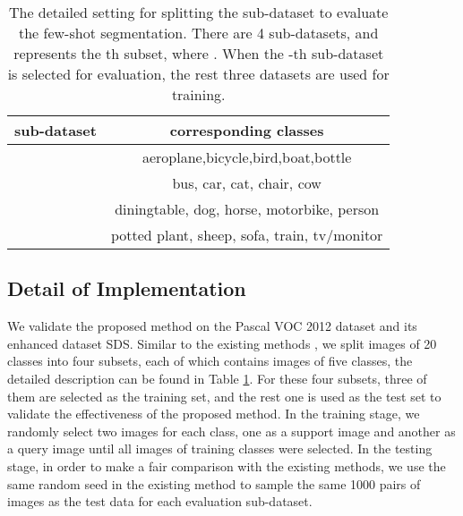 \documentclass[runningheads]{llncs}
\begin{document}
\begin{table}[h]
        \centering
        \caption{The detailed setting for splitting the sub-dataset to evaluate the few-shot segmentation. There are 4 sub-datasets, and  represents the th subset, where . When the -th sub-dataset is selected for evaluation, the rest three datasets are used for training.}
        \label{table_subdataset}
        \begin{tabular}{|c|c|}
                \hline
                sub-dataset&corresponding classes\\
                \hline
                &aeroplane,bicycle,bird,boat,bottle\\
                &bus, car, cat, chair, cow\\
                &diningtable, dog, horse, motorbike, person\\
                &potted plant, sheep, sofa, train, tv/monitor\\
                \hline
        \end{tabular}
\end{table}

\subsection{Detail of Implementation}
We validate the proposed method on the Pascal VOC 2012\cite{ref_voc} dataset and its enhanced dataset SDS\cite{ref_sds}. Similar to the existing methods \cite{ref_first_one,ref_conditional,ref_sgone,ref_aaai,ref_cvpr}, we split images of 20 classes into four subsets, each of which contains images of five classes, the detailed description can be found in Table \ref{table_subdataset}. For these four subsets, three of them are selected as the training set, and the rest one is used as the test set to validate the effectiveness of the proposed method. In the training stage, we randomly select two images for each class, one as a support image and another as a query image until all images of training classes were selected. In the testing stage, in order to make a fair comparison with the existing methods, we use the same random seed in the existing method to sample the same 1000 pairs of images as the test data for each evaluation sub-dataset.
\end{document}
